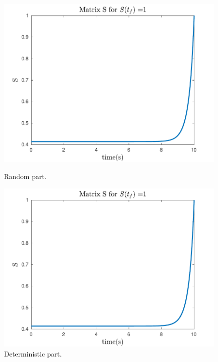 \documentclass{article}
\begin{document}
\begin{figure}[H]
  \centering
  \begin{minipage}[b]{0.45\textwidth}
    \includegraphics[width=\textwidth]{fig1}
	\caption{Random part.}
  \end{minipage}
  \hfill
  \begin{minipage}[b]{0.45\textwidth}
    \includegraphics[width=\textwidth]{fig6}
	\caption{Deterministic part.}
  \end{minipage}
\end{figure}
\end{document}
